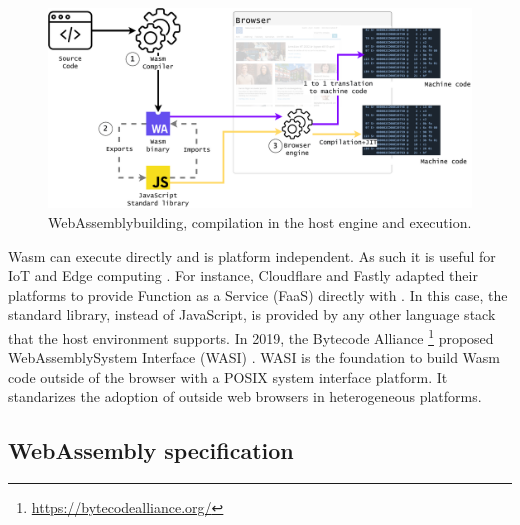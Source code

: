 \begin{figure}[h]
    \centering
    \includegraphics[width=\linewidth]{diagrams/wasm_workflow.pdf}
    \caption{WebAssemblybuilding, compilation in the host engine and execution. }
    \label{diagrams:sota:wasm}
\end{figure}

Wasm can execute directly and is platform independent. As such it is useful for IoT and Edge computing \cite{Narayan2021Swivel,Sledge}. For instance, Cloudflare and Fastly adapted their platforms to provide Function as a Service (FaaS) directly with \wasm. In this case, the standard library, instead of JavaScript, is provided by any other language stack that the host environment supports.
In 2019, the Bytecode Alliance \footnote{\url{https://bytecodealliance.org/}} proposed WebAssemblySystem Interface (WASI) \cite{WASI}. WASI is the foundation to build Wasm  code outside of the browser with a POSIX system interface platform. It standarizes the adoption of \wasm outside web browsers \cite{bryant2020webassembly} in heterogeneous platforms. 


%







\subsection{WebAssembly specification}

